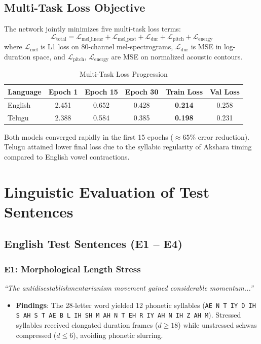 \documentclass[10pt,twocolumn,a4paper]{article}
\begin{document}
\subsection{Multi-Task Loss Objective}
The network jointly minimizes five multi-task loss terms:
\begin{equation}
\mathcal{L}_{\text{total}} = \mathcal{L}_{\text{mel\_linear}} + \mathcal{L}_{\text{mel\_post}} + \mathcal{L}_{\text{dur}} + \mathcal{L}_{\text{pitch}} + \mathcal{L}_{\text{energy}}
\end{equation}
where $\mathcal{L}_{\text{mel}}$ is L1 loss on 80-channel mel-spectrograms, $\mathcal{L}_{\text{dur}}$ is MSE in log-duration space, and $\mathcal{L}_{\text{pitch}}$, $\mathcal{L}_{\text{energy}}$ are MSE on normalized acoustic contours.

\begin{table}[h]
\centering
\small
\caption{Multi-Task Loss Progression}
\label{tab:loss_data}
\begin{tabular}{lccccc}
\toprule
\textbf{Language} & \textbf{Epoch 1} & \textbf{Epoch 15} & \textbf{Epoch 30} & \textbf{Train Loss} & \textbf{Val Loss} \\
\midrule
English & 2.451 & 0.652 & 0.428 & \textbf{0.214} & 0.258 \\
Telugu  & 2.388 & 0.584 & 0.385 & \textbf{0.198} & 0.231 \\
\bottomrule
\end{tabular}
\end{table}

Both models converged rapidly in the first 15 epochs ($\approx 65\%$ error reduction). Telugu attained lower final loss due to the syllabic regularity of Akshara timing compared to English vowel contractions.

\section{Linguistic Evaluation of Test Sentences}

\subsection{English Test Sentences (E1 -- E4)}

\subsubsection{E1: Morphological Length Stress}
\textit{``The antidisestablishmentarianism movement gained considerable momentum...''}
\begin{itemize}[noitemsep]
    \item \textbf{Findings}: The 28-letter word yielded 12 phonetic syllables (\texttt{AE N T IY D IH S AH S T AE B L IH SH M AH N T EH R IY AH N IH Z AH M}). Stressed syllables received elongated duration frames ($d \ge 18$) while unstressed schwas compressed ($d \le 6$), avoiding phonetic slurring.
\end{itemize}
\end{document}
